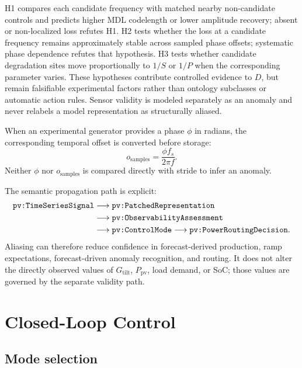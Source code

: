 H1 compares each candidate frequency with matched nearby non-candidate controls and predicts higher MDL codelength or lower amplitude recovery; absent or non-localized loss refutes H1. H2 tests whether the loss at a candidate frequency remains approximately stable across sampled phase offsets; systematic phase dependence refutes that hypothesis. H3 tests whether candidate degradation sites move proportionally to $1/S$ or $1/P$ when the corresponding parameter varies. These hypotheses contribute controlled evidence to $D$, but remain falsifiable experimental factors rather than ontology subclasses or automatic action rules. Sensor validity is modeled separately as an anomaly and never relabels a model representation as structurally aliased.

When an experimental generator provides a phase $\phi$ in radians, the corresponding temporal offset is converted before storage:
\begin{equation}
o_{\mathrm{samples}}=\frac{\phi f_s}{2\pi f}.
\label{eq:phase-conversion}
\end{equation}
Neither $\phi$ nor $o_{\mathrm{samples}}$ is compared directly with stride to infer an anomaly.

The semantic propagation path is explicit:
\begin{equation}
\begin{aligned}
\texttt{pv:TimeSeriesSignal}
&\longrightarrow \texttt{pv:PatchedRepresentation}\\
&\longrightarrow \texttt{pv:ObservabilityAssessment}\\
&\longrightarrow \texttt{pv:ControlMode}
\longrightarrow \texttt{pv:PowerRoutingDecision}.
\end{aligned}
\label{eq:semantic-path}
\end{equation}
Aliasing can therefore reduce confidence in forecast-derived production, ramp expectations, forecast-driven anomaly recognition, and routing. It does not alter the directly observed values of $G_{\mathrm{tilt}}$, $P_{\mathrm{pv}}$, load demand, or SoC; those values are governed by the separate validity path.

\section{Closed-Loop Control}

\subsection{Mode selection}

